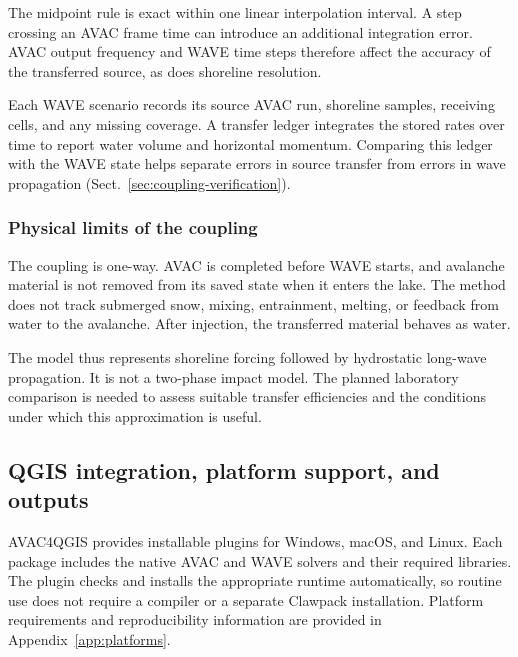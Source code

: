 \documentclass[11pt,a4paper]{article}
\newif\ifdraftnotes
\newcommand{\figureplan}[2]{%
  \ifdraftnotes
    \begin{figure}[htbp]
      \centering
      \fcolorbox{papergrid}{white}{%
        \parbox[c][42mm][c]{.88\textwidth}{%
          \centering
          \textcolor{paperink}{\textbf{Planned figure: #1}}\\[5pt]
          \small #2
        }
      }
      \caption{Working placeholder for #1.}
    \end{figure}
  \fi
}
\begin{document}
The midpoint rule is exact within one linear interpolation interval.
A step crossing an AVAC frame time can introduce an additional integration
error. AVAC output frequency and WAVE time steps therefore affect the
accuracy of the transferred source, as does shoreline resolution.

Each WAVE scenario records its source AVAC run, shoreline samples, receiving
cells, and any missing coverage. A transfer ledger integrates the stored
rates over time to report water volume and horizontal momentum. Comparing
this ledger with the WAVE state helps separate errors in source transfer
from errors in wave propagation
(Sect.~\ref{sec:coupling-verification}).

\subsubsection{Physical limits of the coupling}

The coupling is one-way. AVAC is completed before WAVE starts, and avalanche
material is not removed from its saved state when it enters the lake.
The method does not track submerged snow, mixing, entrainment, melting, or
feedback from water to the avalanche. After injection, the transferred
material behaves as water.

The model thus represents shoreline forcing followed by hydrostatic
long-wave propagation. It is not a two-phase impact model. The planned
laboratory comparison is needed to assess suitable transfer efficiencies
and the conditions under which this approximation is useful.

\figureplan{internal shoreline transfer}{Show the lake mask, inward shoreline
normals, sampled avalanche flux, volume and momentum transfer, and the
receiving WAVE cells.}

\newpage
\subsection{QGIS integration, platform support, and outputs}
\label{sec:qgis-integration}

AVAC4QGIS provides installable plugins for Windows, macOS, and Linux. Each
package includes the native AVAC and WAVE solvers and their required
libraries. The plugin checks and installs the appropriate runtime
automatically, so routine use does not require a compiler or a separate
Clawpack installation. Platform requirements and reproducibility information
are provided in Appendix~\ref{app:platforms}.
\end{document}
